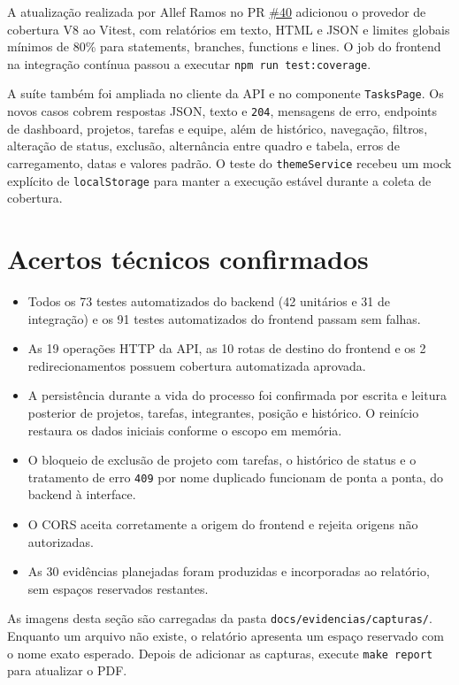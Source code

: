 \documentclass[12pt,a4paper,openany]{report}
\begin{document}
A atualização realizada por Allef Ramos no PR \href{https://github.com/JulianaBallin/orbit-board-equipe-01/pull/40}{\#40} adicionou o provedor de cobertura V8 ao Vitest, com relatórios em texto, HTML e JSON e limites globais mínimos de 80\% para statements, branches, functions e lines. O job do frontend na integração contínua passou a executar \texttt{npm run test:coverage}.

A suíte também foi ampliada no cliente da API e no componente \texttt{TasksPage}. Os novos casos cobrem respostas JSON, texto e \texttt{204}, mensagens de erro, endpoints de dashboard, projetos, tarefas e equipe, além de histórico, navegação, filtros, alteração de status, exclusão, alternância entre quadro e tabela, erros de carregamento, datas e valores padrão. O teste do \texttt{themeService} recebeu um mock explícito de \texttt{localStorage} para manter a execução estável durante a coleta de cobertura.

\section{Acertos técnicos confirmados}

\begin{itemize}
  \item Todos os 73 testes automatizados do backend (42 unitários e 31 de integração) e os 91 testes automatizados do frontend passam sem falhas.
  \item As 19 operações HTTP da API, as 10 rotas de destino do frontend e os 2 redirecionamentos possuem cobertura automatizada aprovada.
  \item A persistência durante a vida do processo foi confirmada por escrita e leitura posterior de projetos, tarefas, integrantes, posição e histórico. O reinício restaura os dados iniciais conforme o escopo em memória.
  \item O bloqueio de exclusão de projeto com tarefas, o histórico de status e o tratamento de erro \texttt{409} por nome duplicado funcionam de ponta a ponta, do backend à interface.
  \item O CORS aceita corretamente a origem do frontend e rejeita origens não autorizadas.
  \item As 30 evidências planejadas foram produzidas e incorporadas ao relatório, sem espaços reservados restantes.
\end{itemize}

As imagens desta seção são carregadas da pasta \texttt{docs/evidencias/capturas/}. Enquanto um arquivo não existe, o relatório apresenta um espaço reservado com o nome exato esperado. Depois de adicionar as capturas, execute \texttt{make report} para atualizar o PDF.
\end{document}
